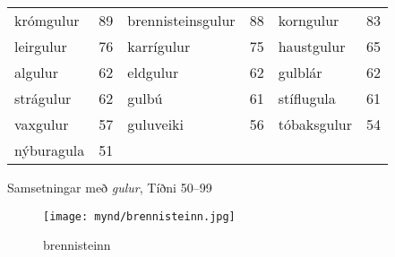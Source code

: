 \documentclass[../samsetningasafn.tex]{subfiles}
\begin{document}
\begin{wordlist}[H]
\begin{tcolorbox}

	\setlength{\extrarowheight}{3pt}
	\begin{tabular}{BlBlBl}
		krómgulur		& 89		& 		
		brennisteinsgulur	& 88		& 	
		korngulur		& 83		\\  		
		leirgulur			& 76		& 
		karrígulur		& 75		&  
		haustgulur		& 65		\\  	
		algulur			& 62		& 	
		eldgulur			& 62		& 	
		gulblár			& 62		\\ 	
		strágulur			& 62		& 
		gulbú			& 61		& 	
		stíflugula		& 61		\\ 
		vaxgulur			& 57		& 	
		guluveiki			& 56		& 
		tóbaksgulur		& 54		\\ 
		nýburagula		& 51		& 	
						&			&
						&	
	\end{tabular}

\end{tcolorbox}
	\caption{Samsetningar með \textit{gulur}, Tíðni 50--99}
	\label{listi:gult.50}
\end{wordlist}

\begin{figure}[H]
\begin{tcolorbox}
\centering
	\texttt{[image: mynd/brennisteinn.jpg]}
\end{tcolorbox}
	\caption{brennisteinn}
	\label{mynd:brennisteinn}
\end{figure}
\end{document}
